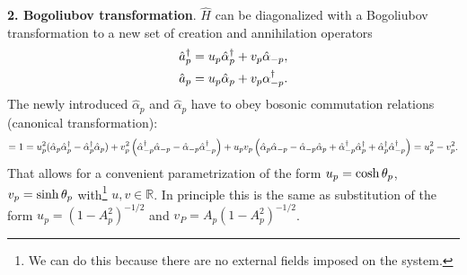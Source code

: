 
\textbf{2. Bogoliubov transformation}. 
$\hat{H}$ can be diagonalized with a Bogoliubov transformation to a new set of creation and annihilation operators
\begin{equation}
	\left.\begin{aligned}
    	\hat{a}_p^{\dag} &= u_p \hat{\alpha}_p^{\dag} + v_p \hat{\alpha}_{-p}, \\
		\hat{a}_p &= u_p \hat{\alpha}_p + v_p \alpha_{-p}^{\dag}.
	\end{aligned}\right.
	\label{Btransform}
\end{equation}
The newly introduced $\hat{\alpha}_p$  and $\hat{\alpha}_p$ have to obey bosonic commutation relations (canonical transformation):
\begin{equation*}
	[\hat{a}_p, \hat{a}_p\D] = 1 = u_p^2 (\hat{\alpha}_p \hat{\alpha}_p\D-\hat{\alpha}_p\D \hat{\alpha}_p) + v_p^2 \left(\hat{\alpha}_{-p}\D \hat{\alpha}_{-p}-\hat{\alpha}_{-p} \hat{\alpha}_{-p}\D\right) + u_p v_p \left(
		\hat{\alpha}_p \hat{\alpha}_{-p} - \hat{\alpha}_{-p} \hat{\alpha}_p + \hat{\alpha}_{-p}\D \hat{\alpha}_{p}\D + \hat{\alpha}_{p}\D \hat{\alpha}_{-p}\D
	\right) = u_p^2 - v_p^2.
\end{equation*}
That allows for a convenient parametrization of the form $u_p = \mathop{\mathrm{cosh}}\nolimits \theta_p$, $v_p = \mathop{\mathrm{sinh}}\nolimits \theta_p$ with\footnote{
	We can do this because there are no external fields imposed on the system.
} $u,v \in \mathbb{R}$. In principle this is the same as substitution of the form $u_p = (1-A_p^2)^{-1/2}$ and $v_P = A_p (1-A_p^2)^{-1/2}$.


